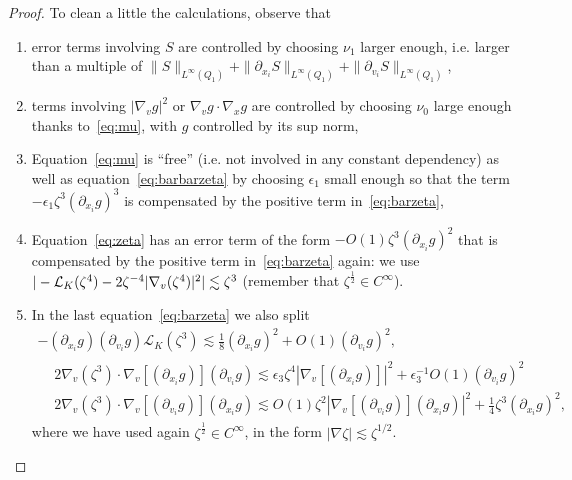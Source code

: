 \documentclass[AHL,Unicode,longabstracts,published]{cedram}
\newcommand{\cL}{\mathcal{L}}
\begin{document}
\begin{proof}
To clean a little the calculations, observe that
\begin{enumerate}
\item \label{proofprop3.1.1}error terms involving $S$ are controlled by choosing $\nu_1$ larger enough, i.e. larger than a multiple of $\|S\|_{L^\infty(Q_1)} +\|\partial_{x_i} S\|_{L^\infty(Q_1)}+\|\partial_{v_i} S\|_{L^\infty(Q_1)}$,
\item \label{proofprop3.1.2}terms involving $|\nabla_v g|^2$ or $\nabla_v g \cdot \nabla_x g$ are controlled by choosing $\nu_0$ large enough thanks to~\eqref{eq:mu}, with $g$ controlled by its sup norm,
\item \label{proofprop3.1.3}Equation~\eqref{eq:mu} is ``free'' (i.e. not involved in any constant dependency) as well as equation~\eqref{eq:barbarzeta} by choosing $\epsilon_1$ small enough so that the term $-\epsilon_1 \zeta^3 (\partial_{x_i} g)^3$ is compensated by the positive term in~\eqref{eq:barzeta},
\item \label{proofprop3.1.4}Equation~\eqref{eq:zeta} has an error term of the form $-O(1) \zeta^3 (\partial_{x_i} g)^2$ that is compensated by the positive term in~\eqref{eq:barzeta} again: we use $|- \cL_K (\zeta^4) - 2 \zeta^{-4} |\nabla_v (\zeta^4)|^2 |\linebreak
\lesssim \zeta^3$ (remember that $\zeta^{\frac12} \in C^\infty$).
\item \label{proofprop3.1.5}In the last equation~\eqref{eq:barzeta} we also split
\begin{multline*}
- (\partial_{x_i}g)(\partial_{v_i} g) \cL_K (\zeta^3)
\lesssim \frac18 (\partial_{x_i} g)^2 + O(1) (\partial_{v_i} g)^2,\\
\begin{aligned}
& 2 \nabla_v (\zeta^3) \cdot \nabla_v [(\partial_{x_i} g)] (\partial_{v_i}g) \lesssim \epsilon_3 \zeta^4 |\nabla_v [(
\partial_{x_i} g)]|^2 + \epsilon_3 ^{-1} O(1) (\partial_{v_i}g) ^2 \\
& 2 \nabla_v (\zeta^3) \cdot \nabla_v [(\partial_{v_i}g)] (
\partial_{x_i} g) \lesssim O(1) \zeta^2 |\nabla_v [(\partial_{v_i}g)] (\partial_{x_i} g)|^2 + \frac{1}{4}
\zeta^3(\partial_{x_i} g)^2,
\end{aligned}
\end{multline*}
where we have used again $\zeta^{\frac12} \in C^\infty$, in the form $|\nabla \zeta| \lesssim \zeta^{1/2}$.
\end{enumerate}


\end{proof}
\end{document}
